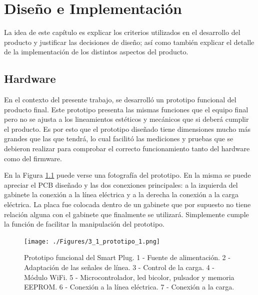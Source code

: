 \chapter{Diseño e Implementación} %

\label{Chapter3} %


La idea de este capítulo es explicar los criterios utilizados en el desarrollo del producto y justificar las decisiones de diseño; así como también explicar el detalle de la implementación de los distintos aspectos del producto.

\section{Hardware}
\label{section:hardware}

En el contexto del presente trabajo, se desarrolló un prototipo funcional del producto final. Este prototipo presenta las mismas funciones que el equipo final pero no se ajusta a los lineamientos estéticos y mecánicos que si deberá cumplir el producto. Es por esto que el prototipo diseñado tiene dimensiones mucho más grandes que las que tendrá, lo cual facilitó las mediciones y pruebas que se debieron realizar para comprobar el correcto funcionamiento tanto del hardware como del firmware. 

En la Figura \ref{fig:prototipo} puede verse una fotografía del prototipo. En la misma se puede apreciar el PCB diseñado y las dos conexiones principales: a la izquierda del gabinete la conexión a la línea eléctrica y a la derecha la conexión a la carga eléctrica. La placa fue colocada dentro de un gabinete que por supuesto no tiene relación alguna con el gabinete que finalmente se utilizará. Simplemente cumple la función de facilitar la manipulación del prototipo.

\begin{figure}[h]
	\centering
	\texttt{[image: ./Figures/3\_1\_prototipo\_1.png]}
	\caption{Prototipo funcional del Smart Plug. 1 - Fuente de alimentación. 2 - Adaptación de las señales de línea. 3 - Control de la carga. 4 - Módulo WiFi. 5 - Microcontrolador, led bicolor, pulsador y memoria EEPROM. 6 - Conexión a la línea eléctrica. 7 - Conexión a la carga.}
	\label{fig:prototipo}
\end{figure}

